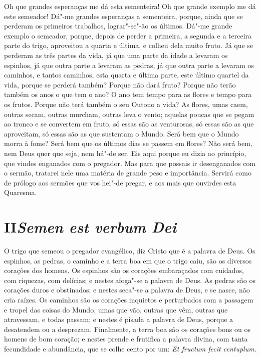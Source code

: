 Oh que grandes esperanças me dá esta sementeira! Oh que
grande exemplo me dá este semeador! Dá"-me grandes esperanças a
sementeira, porque, ainda que se perderam os primeiros trabalhos,
lograr"-se"-ão os últimos. Dá"-me grande exemplo o semeador, porque, depois
de perder a primeira, a segunda e a terceira parte do trigo, aproveitou
a quarta e última, e colheu dela muito fruto. Já que se perderam as três
partes da vida, já que uma parte da idade a levaram os espinhos, já que
outra parte a levaram as pedras, já que outra parte a levaram os
caminhos, e tantos caminhos, esta quarta e última parte, este último
quartel da vida, porque se perderá também? Porque não dará fruto?
Porque não terão também os anos o que tem o ano? O ano tem tempo para as
flores e tempo para os
frutos. Porque não terá também o seu Outono a vida? As flores, umas
caem, outras secam, outras murcham, outras leva o vento; aquelas poucas
que se pegam ao tronco e se convertem em fruto, só essas são as
venturosas, só essas são as que aproveitam, só essas são as que
sustentam o Mundo. Será bem que o Mundo morra à fome? Será bem que os
últimos dias se passem em flores? Não será bem, nem Deus quer que
seja, nem há"-de ser. Eis aqui porque eu dizia ao princípio, que vindes
enganados com o pregador. Mas para que possais ir desenganados com o
sermão, tratarei nele uma matéria de grande peso e importância. Servirá
como de prólogo aos sermões que vos hei"-de pregar, e aos mais que
ouvirdes esta Quaresma.

\section*{II\break\textit{Semen est verbum Dei}}


O trigo que semeou o pregador evangélico, diz Cristo que é a palavra
de Deus. Os espinhos, as pedras, o caminho e a terra boa em que o trigo
caiu, são os diversos corações dos homens. Os espinhos são os corações
embaraçados com cuidados, com riquezas, com delícias; e nestes
afoga"-se a palavra de Deus. As pedras são os corações duros e
obstinados; e nestes seca"-se a palavra de Deus, e se nasce, não cria
raízes. Os caminhos são os corações inquietos e perturbados com a
passagem e tropel das coisas do Mundo, umas que vão, outras que vêm,
outras que atravessam, e todas passam; e nestes é pisada a palavra de
Deus, porque a desatendem ou a desprezam. Finalmente, a terra boa são
os corações bons ou os homens de bom coração; e nestes prende e
frutifica a palavra divina, com tanta fecundidade e abundância, que se
colhe cento por um: \emph{Et fructum fecit centuplum.}

